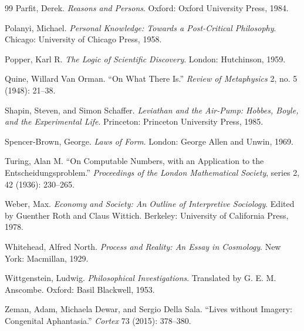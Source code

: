 \documentclass[11pt,openany,twoside]{book}
\theoremstyle{plain}
\theoremstyle{definition}
\theoremstyle{remark}
\begin{document}
\begin{thebibliography}{99}
 Parfit, Derek. \emph{Reasons and Persons}. Oxford: Oxford University Press, 1984.

 Polanyi, Michael. \emph{Personal Knowledge: Towards a Post-Critical Philosophy}. Chicago: University of Chicago Press, 1958.

 Popper, Karl R. \emph{The Logic of Scientific Discovery}. London: Hutchinson, 1959.

 Quine, Willard Van Orman. ``On What There Is.'' \emph{Review of Metaphysics} 2, no. 5 (1948): 21--38.

 Shapin, Steven, and Simon Schaffer. \emph{Leviathan and the Air-Pump: Hobbes, Boyle, and the Experimental Life}. Princeton: Princeton University Press, 1985.

 Spencer-Brown, George. \emph{Laws of Form}. London: George Allen and Unwin, 1969.

 Turing, Alan M. ``On Computable Numbers, with an Application to the Entscheidungsproblem.'' \emph{Proceedings of the London Mathematical Society}, series 2, 42 (1936): 230--265.

 Weber, Max. \emph{Economy and Society: An Outline of Interpretive Sociology}. Edited by Guenther Roth and Claus Wittich. Berkeley: University of California Press, 1978.

 Whitehead, Alfred North. \emph{Process and Reality: An Essay in Cosmology}. New York: Macmillan, 1929.

 Wittgenstein, Ludwig. \emph{Philosophical Investigations}. Translated by G. E. M. Anscombe. Oxford: Basil Blackwell, 1953.

 Zeman, Adam, Michaela Dewar, and Sergio Della Sala. ``Lives without Imagery: Congenital Aphantasia.'' \emph{Cortex} 73 (2015): 378--380.

\end{thebibliography}
\end{document}

